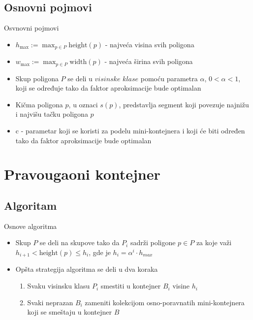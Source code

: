 \documentclass{beamer}
\theoremstyle{plain}
\begin{document}
\subsection{Osnovni pojmovi}
\begin{frame}{Osvnovni pojmovi}
\begin{itemize}
    \item $h_{\text{max}} := \max_{p \in P} \text{height}(p)$ - najveća visina svih poligona
    \item $w_{\text{max}} := \max_{p \in P} \text{width}(p)$ - najveća širina svih poligona
    \item Skup poligona $P$ se deli u $visinske$ $klase$ pomoću parametra $\alpha$, $0<\alpha<1$, koji se određuje tako da faktor aproksimacije bude optimalan
    \item Kičma poligona $p$, u oznaci $s(p)$, predstavlja segment koji povezuje najnižu i najvišu tačku poligona $p$
    \item c - parametar koji se koristi za podelu mini-kontejnera i koji će biti određen tako da faktor aproksimacije bude optimalan
    
\end{itemize}
\end{frame}

\section{Pravougaoni kontejner}
\subsection{Algoritam}
\begin{frame}{Osnove algoritma}
\begin{itemize}
\item Skup $P$ se deli na skupove  tako da $P_i$ sadrži poligone $p\in P$ za koje važi $h_{i+1}<\text{height}(p)\leq h_i$, gde je $h_i=\alpha^i\cdot h_{max}$
    \item Opšta strategija algoritma se deli u dva koraka
    \begin{enumerate}
        \item Svaku visinsku klasu $P_i$ smestiti u kontejner $B_i$ visine $h_i$
        \item Svaki neprazan $B_i$ zameniti kolekcijom osno-poravnatih mini-kontejnera koji se smeštaju u kontejner $B$
    \end{enumerate}
    
    
\end{itemize}
\end{frame}
\end{document}
